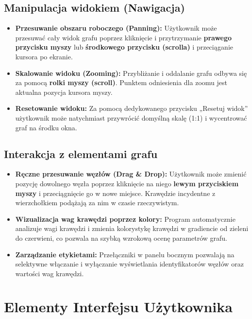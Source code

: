 \documentclass[12pt, a4paper]{article}
\begin{document}
\subsection{Manipulacja widokiem (Nawigacja)}
\begin{itemize}[label=$\square$]
    \item \textbf{Przesuwanie obszaru roboczego (Panning):} Użytkownik może przesuwać cały widok grafu poprzez kliknięcie i przytrzymanie \textbf{prawego przycisku myszy} lub \textbf{środkowego przycisku (scrolla)} i przeciąganie kursora po ekranie.
    \item \textbf{Skalowanie widoku (Zooming):} Przybliżanie i oddalanie grafu odbywa się za pomocą \textbf{rolki myszy (scroll)}. Punktem odniesienia dla zoomu jest aktualna pozycja kursora myszy.
    \item \textbf{Resetowanie widoku:} Za pomocą dedykowanego przycisku „Resetuj widok” użytkownik może natychmiast przywrócić domyślną skalę (1:1) i wycentrować graf na środku okna.
\end{itemize}

\subsection{Interakcja z elementami grafu}
\begin{itemize}[label=$\square$]
    \item \textbf{Ręczne przesuwanie węzłów (Drag \& Drop):} Użytkownik może zmienić pozycję dowolnego węzła poprzez kliknięcie na niego \textbf{lewym przyciskiem myszy} i przeciągnięcie go w nowe miejsce. Krawędzie incydentne z wierzchołkiem podążają za nim w czasie rzeczywistym.
    \item \textbf{Wizualizacja wag krawędzi poprzez kolory:} Program automatycznie analizuje wagi krawędzi i zmienia kolorystykę krawędzi w gradiencie od zieleni do czerwieni, co pozwala na szybką wzrokową ocenę parametrów grafu.
    \item \textbf{Zarządzanie etykietami:} Przełączniki w panelu bocznym pozwalają na selektywne włączanie i wyłączanie wyświetlania identyfikatorów węzłów oraz wartości wag krawędzi.
\end{itemize}

\section{Elementy Interfejsu Użytkownika}
\end{document}
